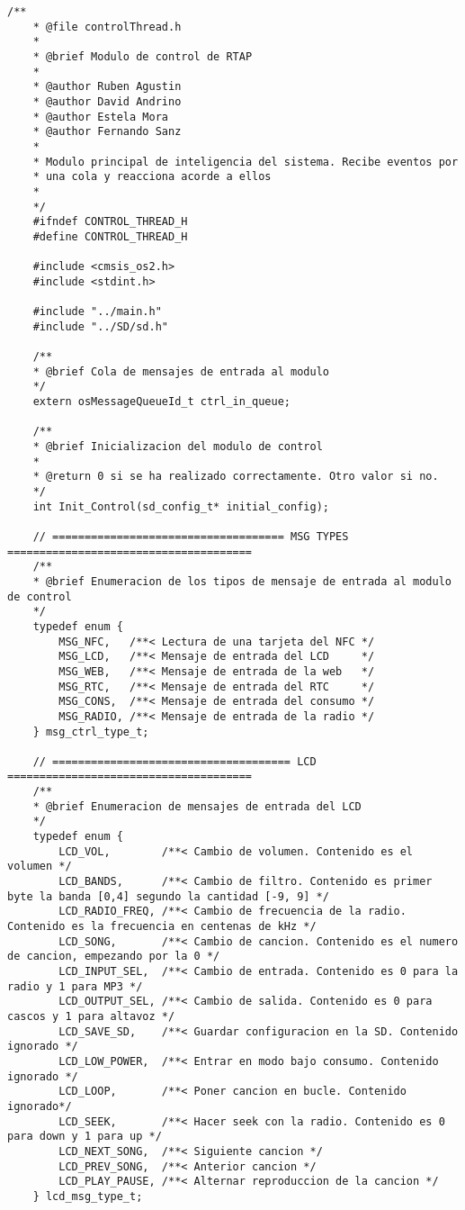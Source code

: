 \label{anexo:mensajes-control}
\begin{lstlisting}[captionpos=t, caption={Fichero \texttt{controlThread.h} con las estructuras de mensajes}]
    /**
    * @file controlThread.h
    *
    * @brief Modulo de control de RTAP
    *
    * @author Ruben Agustin
    * @author David Andrino
    * @author Estela Mora
    * @author Fernando Sanz
    *
    * Modulo principal de inteligencia del sistema. Recibe eventos por 
    * una cola y reacciona acorde a ellos
    *
    */
    #ifndef CONTROL_THREAD_H
    #define CONTROL_THREAD_H

    #include <cmsis_os2.h>
    #include <stdint.h>

    #include "../main.h"
    #include "../SD/sd.h"

    /**
    * @brief Cola de mensajes de entrada al modulo
    */
    extern osMessageQueueId_t ctrl_in_queue;

    /**
    * @brief Inicializacion del modulo de control
    *
    * @return 0 si se ha realizado correctamente. Otro valor si no.
    */
    int Init_Control(sd_config_t* initial_config);

    // ==================================== MSG TYPES ======================================
    /**
    * @brief Enumeracion de los tipos de mensaje de entrada al modulo de control
    */
    typedef enum {
        MSG_NFC,   /**< Lectura de una tarjeta del NFC */
        MSG_LCD,   /**< Mensaje de entrada del LCD     */
        MSG_WEB,   /**< Mensaje de entrada de la web   */
        MSG_RTC,   /**< Mensaje de entrada del RTC     */
        MSG_CONS,  /**< Mensaje de entrada del consumo */
        MSG_RADIO, /**< Mensaje de entrada de la radio */
    } msg_ctrl_type_t;

    // ===================================== LCD ======================================
    /**
    * @brief Enumeracion de mensajes de entrada del LCD
    */
    typedef enum {
        LCD_VOL,        /**< Cambio de volumen. Contenido es el volumen */
        LCD_BANDS,      /**< Cambio de filtro. Contenido es primer byte la banda [0,4] segundo la cantidad [-9, 9] */
        LCD_RADIO_FREQ, /**< Cambio de frecuencia de la radio. Contenido es la frecuencia en centenas de kHz */
        LCD_SONG,       /**< Cambio de cancion. Contenido es el numero de cancion, empezando por la 0 */
        LCD_INPUT_SEL,  /**< Cambio de entrada. Contenido es 0 para la radio y 1 para MP3 */
        LCD_OUTPUT_SEL, /**< Cambio de salida. Contenido es 0 para cascos y 1 para altavoz */
        LCD_SAVE_SD,    /**< Guardar configuracion en la SD. Contenido ignorado */
        LCD_LOW_POWER,  /**< Entrar en modo bajo consumo. Contenido ignorado */
        LCD_LOOP,       /**< Poner cancion en bucle. Contenido ignorado*/
        LCD_SEEK,       /**< Hacer seek con la radio. Contenido es 0 para down y 1 para up */
        LCD_NEXT_SONG,  /**< Siguiente cancion */
        LCD_PREV_SONG,  /**< Anterior cancion */
        LCD_PLAY_PAUSE, /**< Alternar reproduccion de la cancion */
    } lcd_msg_type_t;


\end{lstlisting}
